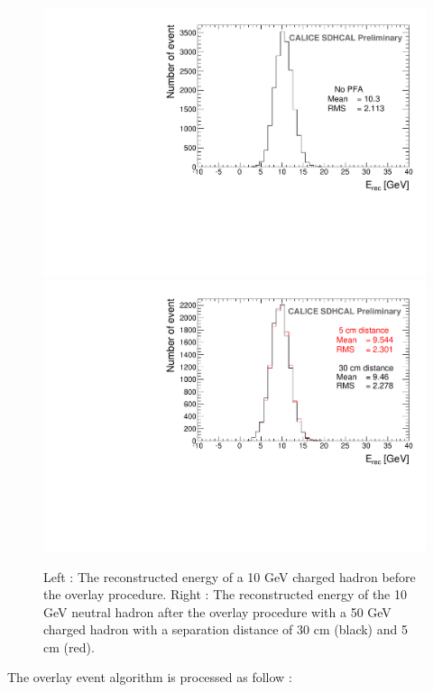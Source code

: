 \documentclass[12pt]{article}
\begin{document}
\begin{figure}[!h]
  \begin{center}
    \includegraphics[width=0.48\linewidth]{plots/SingleParticle_10GeV.pdf}
    \includegraphics[width=0.48\linewidth]{plots/OverlayEvent_OverlayCompare.pdf}
  \end{center}
  \caption{\label{OVERLAY_EVENT_MC_EREC_OVERLAID_HITS} Left : The reconstructed energy of a 10 GeV charged hadron before the overlay procedure. Right : The reconstructed energy of the 10 GeV neutral hadron after the overlay procedure with a 50 GeV charged hadron with a separation distance of 30 cm (black) and 5 cm (red).}
\end{figure}

The overlay event algorithm is processed as follow :
\end{document}
